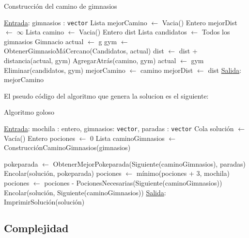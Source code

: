\begin{algorithm}[H]
\label{}
\caption{Construcci\'on del camino de gimnasios}
\begin{algorithmic}[1]
\Statex \underline{Entrada}: gimnasios : \texttt{vector}
\medskip
\State Lista mejorCamino $\leftarrow$ Vacia()
\State Entero mejorDist $\leftarrow$ $\infty$
	\State Lista camino $\leftarrow$ Vacia()
	\State Entero dist
	\State Lista candidatos $\leftarrow$ Todos los gimnasios
	\State Gimnacio actual $\leftarrow$ g
		\State gym $\leftarrow$ ObtenerGimnasioM\'aCercano(Candidatos, actual)
		\State dist $\leftarrow$ dist + distancia(actual, gym)
		\State AgregarAtr\'as(camino, gym)
		\State actual $\leftarrow$ gym
		\State Eliminar(candidatos, gym)
	\EndWhile
		\State mejorCamino $\leftarrow$ camino
		\State mejorDist $\leftarrow$ dist
	\EndIf
\EndFor
\medskip
\Statex \underline{Salida}: mejorCamino
\end{algorithmic}
\end{algorithm}

El pseudo código del algoritmo que genera la solucion es el siguiente:

\begin{algorithm}[H]
\label{}
\caption{Algoritmo goloso}
\begin{algorithmic}[1]
\Statex \underline{Entrada}: mochila : entero, gimnasios: \texttt{vector}, paradas : \texttt{vector}
\State Cola soluci\'on $\leftarrow$ Vac\'ia()
\State Entero pociones $\leftarrow$ 0
\State Lista caminoGimnasios $\leftarrow$ Construcci\'onCaminoGimnasios(gimnasios)

		\State pokeparada $\leftarrow$ ObtenerMejorPokeparada(Siguiente(caminoGimnasios), paradas)
		\State Encolar(soluci\'on, pokeparada)
		\State pociones $\leftarrow$ m\'inimo(pociones + 3, mochila)
	\EndWhile
	\State pociones $\leftarrow$ pociones - PocionesNecesarias(Siguiente(caminoGimnasios))
	Encolar(soluci\'on, Siguiente(caminoGimnasios))
\EndWhile
\medskip
\Statex \underline{Salida}: ImprimirSoluci\'on(soluci\'on)
\end{algorithmic}
\end{algorithm}

\subsection{Complejidad}

